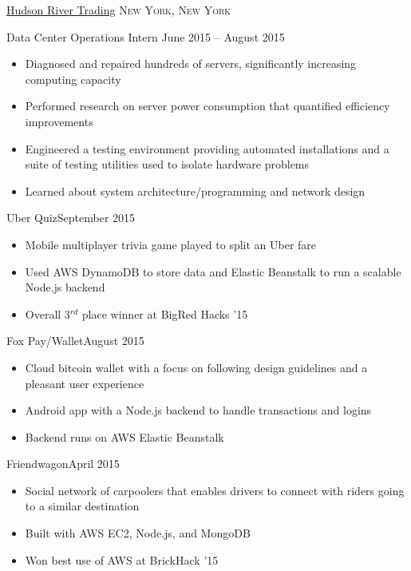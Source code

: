 \documentclass[11pt]{article}
\begin{document}
\headedsection  %
{\href{http://www.hudson-trading.com/}{Hudson River Trading}}
{\textsc{New York, New York}} {
    \headedsubsection
    {Data Center Operations Intern}
    {June 2015 -- August 2015}
    {
        \begin{itemize}
            \item Diagnosed and repaired hundreds of servers, significantly increasing computing capacity
            \item Performed research on server power consumption that quantified efficiency improvements
            \item Engineered a testing environment providing automated installations and a suite of testing utilities used to isolate hardware problems
            \item Learned about system architecture/programming and network design
        \end{itemize}
    }
}


\spacedhrule{0.1em}{0.9em}  %

\headedsubsection
{Uber Quiz}{September 2015}
{
    \begin{itemize}[leftmargin=0.5in]
        \item{Mobile multiplayer trivia game played to split an Uber fare}
        \item{Used AWS DynamoDB to store data and Elastic Beanstalk to run a scalable Node.js backend}
        \item{Overall 3$^{rd}$ place winner at BigRed Hacks '15}
    \end{itemize}
}

\headedsubsection %
{Fox Pay/Wallet}{August 2015}
{
    \begin{itemize}[leftmargin=0.5in]
        \item{Cloud bitcoin wallet with a focus on following design guidelines and a pleasant user experience}
        \item{Android app with a Node.js backend to handle transactions and logins}
        \item{Backend runs on AWS Elastic Beanstalk}
    \end{itemize}
}

\headedsubsection
{Friendwagon}{April 2015}
{
    \begin{itemize}[leftmargin=0.5in]
        \item{Social network of carpoolers that enables drivers to connect with riders going to a similar destination}
        \item{Built with AWS EC2, Node.js, and MongoDB}
        \item{Won best use of AWS at BrickHack '15}
    \end{itemize}
}
\end{document}
